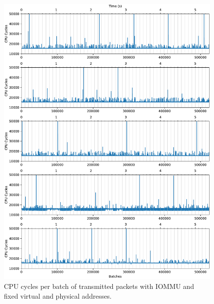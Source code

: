 \begin{figure}%
    \centering
    \includegraphics[width=1.0\textwidth]{figures/iotlb-baseline-iommu-pt-fixed}
    \caption{CPU cycles per batch of transmitted packets with IOMMU and fixed
    virtual and physical addresses.}
    \label{fig:cycles-iommu-pt-fixed}
\end{figure}

